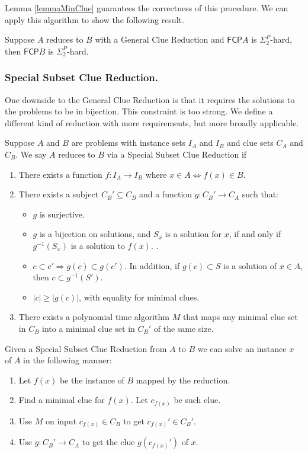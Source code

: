 \documentclass[runningheads,a4paper]{llncs}
\begin{document}
Lemma \ref{lemmaMinClue} guarantees the correctness of this procedure. We can apply this algorithm to show the following result. 

\begin{corollary}
\label{thm:reduction}
Suppose $A$ reduces to $B$ with a General Clue Reduction and $\mathsf{FCP} A$ is $\Sigma_2^P$-hard, then $\mathsf{FCP} B$ is $\Sigma_2^P$-hard. 
\end{corollary}

\subsubsection{Special Subset Clue Reduction.} 

One downside to the General Clue Reduction is that it requires the solutions to the problems to be in bijection. This constraint is too strong. We define a different kind of reduction with more requirements, but more broadly applicable.

\begin{definition}\label{def:SSCR}
Suppose $A$ and $B$ are problems with instance sets $I_A$ and $I_B$ and clue sets $C_A$ and $C_B$. We say $A$ reduces to $B$ via a Special Subset Clue Reduction if
\begin{enumerate}
\item There exists a function $f: I_A \rightarrow I_B$ where $x \in A \iff f(x) \in B$.
\item There exists a subject $C_B' \subseteq C_B$ and a function $g: C_B' \rightarrow C_A$ such that:
\begin{itemize}
\item $g$ is surjective. 
\item $g$ is a bijection on solutions, and $S_x$ is a solution for $x$, if and only if $g^{-1}(S_x)$ is a solution to $f(x)$. .
\item $c \subset c' \Rightarrow g(c) \subset g(c')$. In addition, if $g(c) \subset S$ is a solution of $x \in A$, then $c \subset g^{-1}(S')$.
\item $|c| \geq |g(c)|$, with equality for minimal clues. 
\end{itemize}
\item There exists a polynomial time algorithm $M$ that maps any minimal clue set in $C_B$ into a minimal clue set in $C_B'$ of the same size. 
\end{enumerate}
\end{definition}

Given a Special Subset Clue Reduction from $A$ to $B$ we can solve an instance $x$ of $A$ in the following manner:
\begin{enumerate}
\item Let $f(x)$ be the instance of $B$ mapped by the reduction.
\item Find a minimal clue for $f(x)$. Let $c_{f(x)}$ be such clue. 
\item Use $M$ on input $c_{f(x)} \in C_B$ to get $c_{f(x)}' \in C_B'$. 
\item Use $g: C_B' \rightarrow C_A$ to get the clue $g(c_{f(x)}')$ of $x$.
\end{enumerate}
\end{document}
